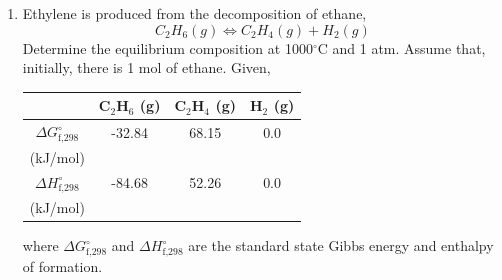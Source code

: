\documentclass[12pts,a4paper,amsmath,amssymb,floatfix]{article}%
\begin{document}
\begin{enumerate}[1)]

\item\label{Example:2} Ethylene is produced from the decomposition of ethane,
       \begin{displaymath}
          C_{2}H_{6} (g) \Longleftrightarrow C_{2}H_{4} (g) + H_{2} (g) 
       \end{displaymath} 
       Determine the equilibrium composition at 1000$^{\circ}$C and 1 atm. Assume that, initially, there is 1 mol of ethane. Given,
       \begin{center}
           \begin{tabular}{|c c c c|}
           \hline
                                        &  C$_{2}$H$_{6}$ (g) & C$_{2}$H$_{4}$ (g) &  H$_{2}$ (g)  \\ 
           \hline
             $\Delta G^{\circ}_{\text{f,298}}$  &  -32.84            &  68.15           & 0.0           \\
                   (kJ/mol)             &                    &                  &               \\
           \hline
             $\Delta H^{\circ}_{\text{f,298}}$  &  -84.68            &  52.26           & 0.0           \\
                   (kJ/mol)             &                    &                  &               \\
           \hline 
           \end{tabular}
       \end{center}
       where $\Delta G^{\circ}_{\text{f,298}}$ and $\Delta H^{\circ}_{\text{f,298}}$ are the standard state Gibbs energy and enthalpy of formation. 

\bigskip


\end{enumerate}
\end{document}
